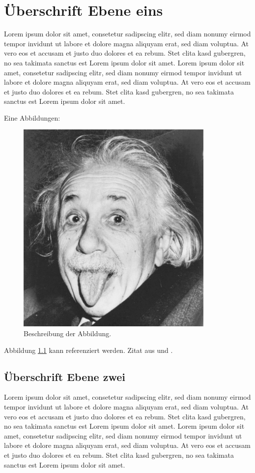 \chapter{Überschrift Ebene eins}

Lorem ipsum dolor sit amet, consetetur sadipscing elitr, sed diam nonumy eirmod tempor invidunt ut labore et dolore magna aliquyam erat, sed diam voluptua. At vero eos et accusam et justo duo dolores et ea rebum. Stet clita kasd gubergren, no sea takimata sanctus est Lorem ipsum dolor sit amet. Lorem ipsum dolor sit amet, consetetur sadipscing elitr, sed diam nonumy eirmod tempor invidunt ut labore et dolore magna aliquyam erat, sed diam voluptua. At vero eos et accusam et justo duo dolores et ea rebum. Stet clita kasd gubergren, no sea takimata sanctus est Lorem ipsum dolor sit amet.

Eine Abbildungen:

\begin{figure}[hb!]
\centering
\includegraphics[scale=0.5]{einstein}
\caption{Beschreibung der Abbildung.}
\label{abb_einstein}
\end{figure}

Abbildung \ref{abb_einstein} kann referenziert werden. Zitat aus \cite{scheme} und \cite[S. 17]{knuth}.

\section{Überschrift Ebene zwei}

Lorem ipsum dolor sit amet, consetetur sadipscing elitr, sed diam nonumy eirmod tempor invidunt ut labore et dolore magna aliquyam erat, sed diam voluptua. At vero eos et accusam et justo duo dolores et ea rebum. Stet clita kasd gubergren, no sea takimata sanctus est Lorem ipsum dolor sit amet. Lorem ipsum dolor sit amet, consetetur sadipscing elitr, sed diam nonumy eirmod tempor invidunt ut labore et dolore magna aliquyam erat, sed diam voluptua. At vero eos et accusam et justo duo dolores et ea rebum. Stet clita kasd gubergren, no sea takimata sanctus est Lorem ipsum dolor sit amet.

